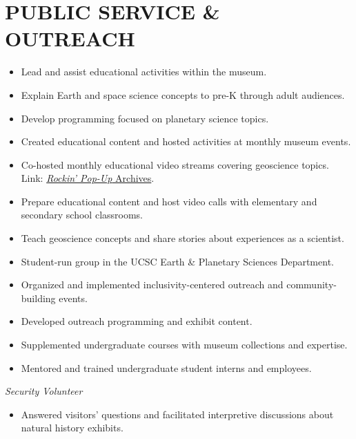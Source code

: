 \section{PUBLIC SERVICE \& OUTREACH}

\begin{itemize}
\item Lead and assist educational activities within the museum.
\item Explain Earth and space science concepts to pre-K through adult audiences.
\item Develop programming focused on planetary science topics.
\end{itemize}

\begin{itemize}
	\item Created educational content and hosted activities at monthly museum events.
	\item Co-hosted monthly educational video streams covering geoscience topics. \\
	Link: \href{https://www.santacruzmuseum.org/category/rockin-pop-up/}{\emph{Rockin' Pop-Up} Archives}.
\end{itemize}

\begin{itemize}
	\item Prepare educational content and host video calls with elementary and secondary school classrooms.
	\item Teach geoscience concepts and share stories about experiences as a scientist.
\end{itemize}

\begin{itemize}
	\item Student-run group in the UCSC Earth \& Planetary Sciences Department.
	\item Organized and implemented inclusivity-centered outreach and community-building events.
\end{itemize}

\begin{itemize}
	\item Developed outreach programming and exhibit content.
	\item Supplemented undergraduate courses with museum collections and expertise.
	\item Mentored and trained undergraduate student interns and employees.
\end{itemize}


\textit{Security Volunteer}
\begin{itemize}
	\item Answered visitors' questions and facilitated interpretive discussions about natural history exhibits.
\end{itemize}